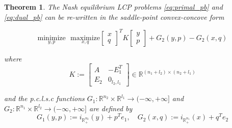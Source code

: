\documentclass[12pt]{article}
\newtheorem{theorem}{Theorem} \newtheorem{lemma}[theorem]{Lemma}
\begin{document}
\begin{theorem}
  The Nash equilibrium LCP problems \eqref{eq:primal_pb} and \eqref{eq:dual_pb} can be re-written in the saddle-point convex-concove form
  
  \begin{equation}
    \underset{y, p}{\text{minimize}}\text{ }\underset{x, q}{\text{maximize}}
           {\begin{bmatrix}x\\q\end{bmatrix}^TK\begin{bmatrix}y\\p\end{bmatrix} + G_2(y, p) - G_2(x, q)}
           \label{eq:unconstrained_pb}
  \end{equation}

  where
  \begin{equation}
    K :=
    \left[
      \begin{array}{c|c}
        A & -E_1^T \\ \hline
        E_2 & 0_{l_2, l_1}
      \end{array}
      \right] \in \mathbb{R}^{(n_1 + l_2) \times (n_2 + l_1)}
\end{equation}

and the p.c.l.s.c functions $G_1: \mathbb{R}^{n_2} \times \mathbb{R}^{l_1} \rightarrow (-\infty, +\infty]$ and \\$G_2: \mathbb{R}^{n_1} \times \mathbb{R}^{l_2} \rightarrow (-\infty, +\infty]$ are defined by
  \begin{equation}
      G_1(y, p) := i_{\mathbb{R}^{n_2}_+}(y) + p^Te_1, \hspace{1em} G_2(x, q) := i_{\mathbb{R}^{n_1}_+}(x) + q^Te_2
    \label{eq:things}
  \end{equation}
  

  \label{thm:pd}
\end{theorem}
\end{document}
